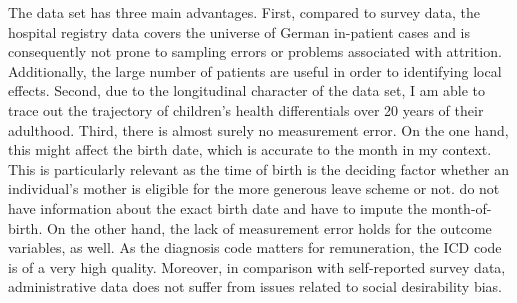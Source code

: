\documentclass[11pt, a4paper,draft]{article} %
\begin{document}
The data set has three main advantages. First, compared to survey data, the hospital registry data covers the universe of German in-patient cases and is consequently not prone to sampling errors or problems associated with attrition. Additionally, the large number of patients are useful in order to identifying local effects. Second, due to the longitudinal character of the data set, I am able to trace out the trajectory of children's health differentials over 20 years of their adulthood. Third, there is almost surely no measurement error. On the one hand, this might affect the birth date, which is accurate to the month in my context. This is particularly relevant as the time of birth is the deciding factor whether an individual's mother is eligible for the more generous leave scheme or not. \cite{Dustmann2012} do not have information about the exact birth date and have to impute the month-of-birth. On the other hand, the lack of measurement error holds for the outcome variables, as well. As the diagnosis code matters for remuneration, the ICD code is of a very high quality. Moreover, in comparison with self-reported survey data, administrative data does not suffer from issues related to social desirability bias.\newline
\end{document}
